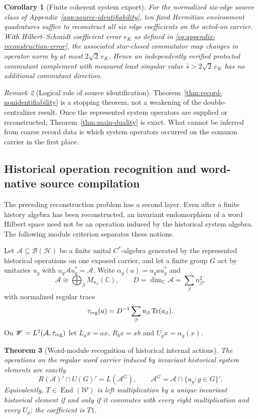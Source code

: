 \documentclass[11pt]{article}
\newtheorem{theorem}{Theorem}[section]
\newtheorem{corollary}[theorem]{Corollary}
\theoremstyle{definition}
\theoremstyle{remark}
\newtheorem{remark}[theorem]{Remark}
\newcommand{\C}{\mathbb C}
\newcommand{\Tr}{\operatorname{Tr}}
\newcommand{\End}{\operatorname{End}}
\newcommand{\A}{\mathcal A}
\newcommand{\Hh}{\mathcal H}
\begin{document}
\begin{corollary}[Finite coherent system export]
\label{cor:finite-system-export}
For the normalized six-edge source class of
Appendix~\ref{app:source-identifiability}, ten fixed Hermitian environment
quadratures suffice to reconstruct all six edge coefficients on the acted-on
carrier.  With Hilbert--Schmidt coefficient error $e_K$ as defined in
\eqref{eq:appendix-reconstruction-error}, the associated star-closed
commutator map changes in operator norm by at most $2\sqrt2\,e_K$.  Hence an
independently verified protected commutant complement with measured least
singular value $\widehat s>2\sqrt2\,e_K$ has no additional commutant direction.
\end{corollary}

\begin{remark}[Logical role of source identification]
Theorem~\ref{thm:record-nonidentifiability} is a stopping theorem, not a
weakening of the double-centralizer result.  Once the represented system
operators are supplied or reconstructed, Theorem~\ref{thm:main-duality} is
exact.  What cannot be inferred from coarse record data is which system
operators occurred on the common carrier in the first place.
\end{remark}

\subsection{Historical operation recognition and word-native source compilation}
\label{sec:historical-operation-recognition}

The preceding reconstruction problem has a second layer.  Even after a finite
history algebra has been reconstructed, an invariant endomorphism of a word
Hilbert space need not be an operation induced by the historical system
algebra.  The following module criterion separates these notions.

Let $\A\subseteq\mathcal B(\Hh)$ be a finite unital $C^*$-algebra generated by
the represented historical operations on one exposed carrier, and let a finite
group $G$ act by unitaries $u_g$ with $u_g\A u_g^*=\A$.  Write
$\alpha_g(a)=u_gau_g^*$ and
\[
 \A\cong\bigoplus_\beta M_{n_\beta}(\C),\qquad
 D=\dim_\C\A=\sum_\beta n_\beta^2,
\]
with normalized regular trace
\[
 \tau_{\rm reg}(a)=D^{-1}\sum_\beta n_\beta\Tr(a_\beta).
\]
On $\mathscr W=L^2(\A,\tau_{\rm reg})$ let
$L_ax=ax$, $R_bx=xb$ and $U_gx=\alpha_g(x)$.

\begin{theorem}[Word-module recognition of historical internal actions]
\label{thm:word-module-recognition}
The operations on the regular word carrier induced by invariant historical
system elements are exactly
\begin{equation}
 \boxed{
 R(\A)'\cap U(G)'=L(\A^G),
 \qquad
 \A^G=\A\cap\{u_g:g\in G\}'.}
 \label{eq:word-module-recognition}
\end{equation}
Equivalently, $T\in\End(\mathscr W)$ is left multiplication by a unique
invariant historical element if and only if it commutes with every right
multiplication and every $U_g$; the coefficient is $T1$.
\end{theorem}
\end{document}
